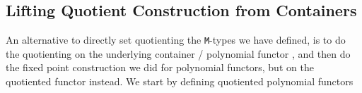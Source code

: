 \documentclass[twoside,11pt,openright]{report}
\theoremstyle{plain} %
\theoremstyle{definition}
\newtheorem{defn}[thm]{Definition}%
\theoremstyle{remark}
\newcommand*{\term}[1]{\textcolor{green!30!black}{#1}} %
\newcommand*{\type}[1]{\textcolor{magenta!90!black}{#1}}
\newcommand*{\containerpair}[2]{\ensuremath{\colorlet{savedleftcolor}{.}\color{orange}\left(\color{savedleftcolor}#1\,\textcolor{orange}{\mathbf{,}}\,#2\color{orange}\right)\color{savedleftcolor}}}
\newcommand*{\universe}[1]{\textcolor{orange!80!black}{#1}}
\newcommand*{\relation}[1]{\textcolor{gray!75!black}{\ensuremath{\mathtt{#1}}}}
\newcommand*{\typeformer}[1]{\ensuremath{\mathtt{#1}}}
\begin{document}
\subsection{Lifting Quotient Construction from Containers}
An alternative to directly set quotienting the \texttt{M}-types we have defined, is to do the quotienting on the underlying container \cite{DBLP:quotient-container} / polynomial functor \cite{DBLP:QM-lean}, and then do the fixed point construction we did for polynomial functors, but on the quotiented functor instead. We start by defining quotiented polynomial functors
    
\end{document}
